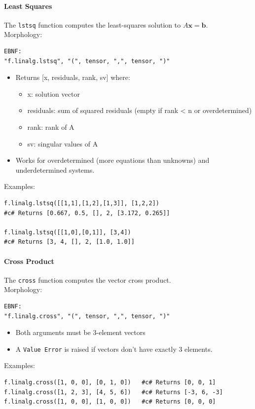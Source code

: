 \paragraph{Least Squares}
The \texttt{lstsq} function computes the least-squares solution to $A\mathbf{x} = \mathbf{b}$.\\
Morphology:
\begin{verbatim}
EBNF:
"f.linalg.lstsq", "(", tensor, ",", tensor, ")"
\end{verbatim}
\begin{itemize}
\item Returns [x, residuals, rank, sv] where:
  \begin{itemize}
  \item x: solution vector
  \item residuals: sum of squared residuals (empty if rank < n or overdetermined)
  \item rank: rank of A
  \item sv: singular values of A
  \end{itemize}
\item Works for overdetermined (more equations than unknowns) and underdetermined systems.
\end{itemize}
Examples:
\begin{verbatim}
f.linalg.lstsq([[1,1],[1,2],[1,3]], [1,2,2])
#c# Returns [0.667, 0.5, [], 2, [3.172, 0.265]]

f.linalg.lstsq([[1,0],[0,1]], [3,4])
#c# Returns [3, 4, [], 2, [1.0, 1.0]]
\end{verbatim}

\paragraph{Cross Product}
The \texttt{cross} function computes the vector cross product.\\
Morphology:
\begin{verbatim}
EBNF:
"f.linalg.cross", "(", tensor, ",", tensor, ")"
\end{verbatim}
\begin{itemize}
\item Both arguments must be 3-element vectors
\item A \texttt{Value Error} is raised if vectors don't have exactly 3 elements.
\end{itemize}
Examples:
\begin{verbatim}
f.linalg.cross([1, 0, 0], [0, 1, 0])   #c# Returns [0, 0, 1]
f.linalg.cross([1, 2, 3], [4, 5, 6])   #c# Returns [-3, 6, -3]
f.linalg.cross([1, 0, 0], [1, 0, 0])   #c# Returns [0, 0, 0]
\end{verbatim}

